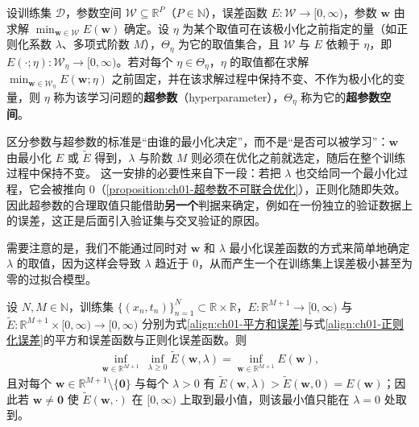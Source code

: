 \documentclass[../../main.tex]{subfiles}
\begin{document}
\begin{definition}[超参数]\label{definition:ch01-超参数}
设训练集 $\mathcal{D}$，参数空间 $\mathcal{W}\subseteq\mathbb{R}^{P}$（$P\in\mathbb{N}$），误差函数 $E:\mathcal{W}\to[0,\infty)$，参数 $\mathbf{w}$ 由求解 $\min_{\mathbf{w}\in\mathcal{W}}E(\mathbf{w})$ 确定。设 $\eta$ 为某个取值可在该极小化之前指定的量（如正则化系数 $\lambda$、多项式阶数 $M$），$\Theta_{\eta}$ 为它的取值集合，且 $\mathcal{W}$ 与 $E$ 依赖于 $\eta$，即 $E(\cdot;\eta):\mathcal{W}_{\eta}\to[0,\infty)$。若对每个 $\eta\in\Theta_{\eta}$，$\eta$ 的取值都在求解 $\min_{\mathbf{w}\in\mathcal{W}_{\eta}}E(\mathbf{w};\eta)$ 之前固定，并在该求解过程中保持不变、不作为极小化的变量，则 $\eta$ 称为该学习问题的\textbf{超参数}（hyperparameter），$\Theta_{\eta}$ 称为它的\textbf{超参数空间}。
\end{definition}

\begin{remark}
区分参数与超参数的标准是“由谁的最小化决定”，而不是“是否可以被学习”：$\mathbf{w}$ 由最小化 $E$ 或 $\tilde{E}$ 得到，$\lambda$ 与阶数 $M$ 则必须在优化之前就选定，随后在整个训练过程中保持不变。
这一安排的必要性来自下一段：若把 $\lambda$ 也交给同一个最小化过程，它会被推向 $0$（\cref{proposition:ch01-超参数不可联合优化}），正则化随即失效。因此超参数的合理取值只能借助\textbf{另一个}判据来确定，例如在一份独立的验证数据上的误差，这正是后面引入验证集与交叉验证的原因。
\end{remark}

需要注意的是，我们不能通过同时对 $\mathbf{w}$ 和 $\lambda$ 最小化误差函数的方式来简单地确定 $\lambda$ 的取值，因为这样会导致 $\lambda$ 趋近于 $0$，从而产生一个在训练集上误差极小甚至为零的过拟合模型。

\begin{proposition}[正则化系数不能与参数联合优化]\label{proposition:ch01-超参数不可联合优化}
设 $N,M\in\mathbb{N}$，训练集 $\{(x_n,t_n)\}_{n=1}^{N}\subset\mathbb{R}\times\mathbb{R}$，$E:\mathbb{R}^{M+1}\to[0,\infty)$ 与 $\tilde{E}:\mathbb{R}^{M+1}\times[0,\infty)\to[0,\infty)$ 分别为式\eqref{align:ch01-平方和误差}与式\eqref{align:ch01-正则化误差}的平方和误差函数与正则化误差函数。则
\begin{align*}
  \inf_{\mathbf{w}\in\mathbb{R}^{M+1}}\ \inf_{\lambda\geqslant 0}\tilde{E}(\mathbf{w},\lambda)
  = \inf_{\mathbf{w}\in\mathbb{R}^{M+1}}E(\mathbf{w}),
\end{align*}
且对每个 $\mathbf{w}\in\mathbb{R}^{M+1}\setminus\{\mathbf{0}\}$ 与每个 $\lambda>0$ 有 $\tilde{E}(\mathbf{w},\lambda)>\tilde{E}(\mathbf{w},0)=E(\mathbf{w})$；因此若 $\mathbf{w}\neq\mathbf{0}$ 使 $\tilde{E}(\mathbf{w},\cdot)$ 在 $[0,\infty)$ 上取到最小值，则该最小值只能在 $\lambda=0$ 处取到。
\end{proposition}
\end{document}
